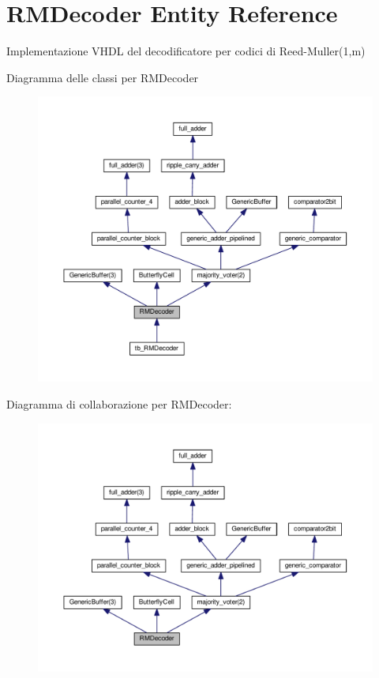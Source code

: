 \hypertarget{class_r_m_decoder}{\section{R\+M\+Decoder Entity Reference}
\label{class_r_m_decoder}
}


Implementazione V\+H\+D\+L del decodificatore per codici di Reed-\/\+Muller(1,m)  




Diagramma delle classi per R\+M\+Decoder\nopagebreak
\begin{figure}[H]
\begin{center}
\leavevmode
\includegraphics[width=350pt]{class_r_m_decoder__inherit__graph}
\end{center}
\end{figure}


Diagramma di collaborazione per R\+M\+Decoder\+:\nopagebreak
\begin{figure}[H]
\begin{center}
\leavevmode
\includegraphics[width=350pt]{class_r_m_decoder__coll__graph}
\end{center}
\end{figure}
